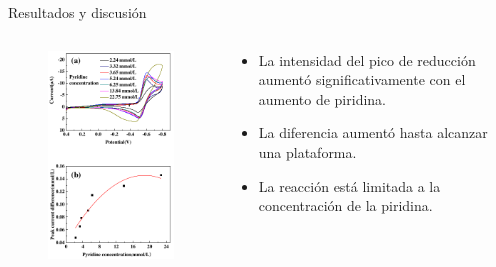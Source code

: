 \documentclass[handout]{beamer}
\begin{document}
\begin{frame}{Resultados y discusi\'on}
	\begin{columns}
		\begin{column}{0.4\textwidth}
			\begin{figure}[h]
				\centering
				\includegraphics[width=\linewidth]{sources/concentration}
			\end{figure}
		\end{column}
		\begin{column}{0.6\textwidth}
			\begin{itemize}
				\item La intensidad del pico de reducci\'on aument\'o significativamente con el aumento de piridina.
				\item La diferencia aument\'o hasta alcanzar una plataforma.
				\item La reacci\'on est\'a limitada a la concentraci\'on de la piridina.
			\end{itemize}
		\end{column}
	\end{columns}
\end{frame}
\end{document}
